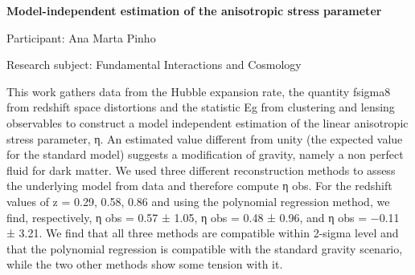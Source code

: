 \hfill 

\begin{minipage}[t]{1.0\textwidth}

\begin{center}

{{\large\bfseries Model-independent estimation of the anisotropic stress parameter}\par}

\end{center}

{\noindent Participant: Ana Marta Pinho\par} 

{\noindent Research subject: Fundamental Interactions and Cosmology\par}\medskip

\noindent This work gathers data from the Hubble expansion rate, the quantity fsigma8 from redshift space distortions and the statistic Eg from clustering and lensing observables to construct a model independent estimation of the linear anisotropic stress parameter, η. An estimated value different from unity (the expected value for the standard model) suggests a modification of gravity, namely a non perfect fluid for dark matter. We used three different reconstruction methods to assess the underlying model from data and therefore compute η obs. For the redshift values of z = 0.29, 0.58, 0.86 and using the polynomial regression method, we find, respectively, η obs = 0.57 ± 1.05, η obs = 0.48 ± 0.96, and η obs = −0.11 ± 3.21. We find that all three methods are compatible within 2-sigma level and that the polynomial regression is compatible with the standard gravity scenario, while the two other methods show some tension with it.\par\end{minipage}

\hfill 

